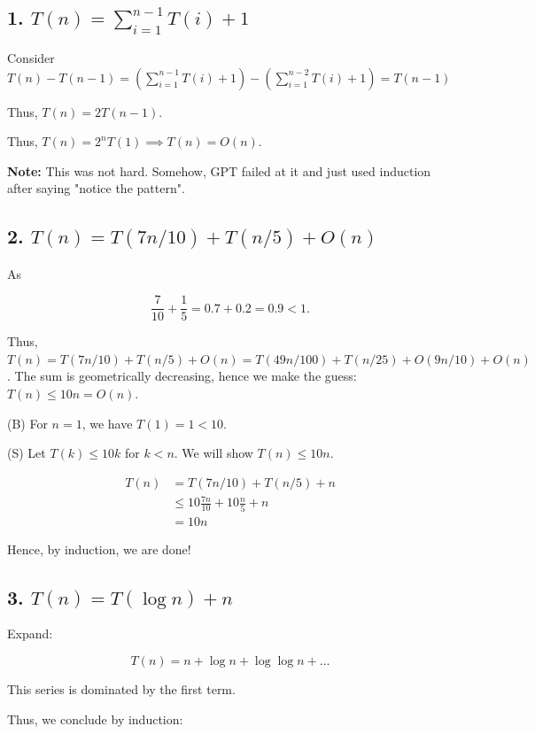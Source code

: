 \documentclass[11pt]{article}
\begin{document}
\subsection{1. $T(n)=\sum_{i=1}^{n-1}T(i)+1$}

Consider $T(n) - T(n-1) = (\sum_{i=1}^{n-1}T(i)+1) - (\sum_{i=1}^{n-2}T(i)+1) = T(n-1)$

Thus, $T(n) = 2T(n-1)$.

Thus, $T(n) = 2^n T(1) \implies T(n) = O(n)$.

\textbf{Note:} This was not hard. Somehow, GPT failed at it and just used induction after saying "notice the pattern".


\newpage

\subsection{2. $T(n)=T(7n/10)+T(n/5)+O(n)$}

As

\[
\frac{7}{10}+\frac{1}{5}=0.7+0.2=0.9<1.
\]

Thus, $T(n) = T(7n/10)+T(n/5)+O(n) = T(49n/100) + T(n/25) + O(9n/10) + O(n)$. The sum is geometrically decreasing, hence we make the guess: $T(n) \le 10 n = O(n)$.

(B) For $n =1$, we have $T(1) = 1 < 10$.

(S) Let $T(k) \le 10k$ for $k < n$. We will show $T(n) \le 10 n$.

\begin{align*}
    T(n) &= T(7n/10)+T(n/5)+ n\\
    &\le 10 \frac{7n}{10} + 10 \frac{n}{5} + n\\
    &= 10 n
\end{align*}

Hence, by induction, we are done!

\newpage

\subsection{3. $T(n)=T(\log n)+n$}

Expand:

\[
T(n)=n+\log n+\log\log n+\dots
\]

This series is dominated by the first term.

Thus, we conclude by induction:
\end{document}
